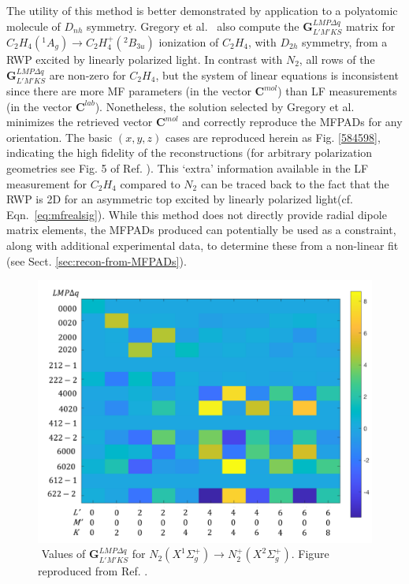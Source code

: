 \documentclass[10pt]{article}
\begin{document}
The utility of this method is better demonstrated by application to a polyatomic molecule of $D_{nh}$ symmetry. Gregory et al.~\cite{gregory2021MolecularFramePhotoelectron} also compute the $\mathbf{{G}}^{LMP\Delta q }_{L'M'KS}$ matrix for $C_2H_4(^1A_g) \rightarrow C_2H_4^+(^2B_{3u})$ ionization of $C_2H_4$, with $D_{2h}$ symmetry, from a RWP excited by linearly polarized light. In contrast with $N_2$, all rows of the $\mathbf{{G}}^{LMP\Delta q }_{L'M'KS}$ are non-zero for $C_2H_4$, but the system of linear equations is inconsistent since there are more MF parameters (in the vector $\mathbf{C}^{mol}$) than LF measurements (in the vector $\mathbf{C}^{lab}$). Nonetheless, the solution selected by Gregory et al. minimizes the retrieved vector $\mathbf{C}^{mol}$ and correctly reproduce the MFPADs for any orientation. The basic $(x,y,z)$ cases are reproduced herein as Fig. \ref{584598}, indicating the high fidelity of the reconstructions (for arbitrary polarization geometries see Fig. 5 of Ref. \cite{gregory2021MolecularFramePhotoelectron}). This `extra' information available in the LF measurement for $C_2H_4$ compared to $N_2$ can be traced back to the fact that the RWP is 2D for an asymmetric top excited by linearly polarized light(cf. Eqn.~\ref{eq:mfrealsig}). While this method does not directly provide radial dipole matrix elements, the MFPADs produced can potentially be used as a constraint, along with additional experimental data, to determine these from a non-linear fit (see Sect. \ref{sec:recon-from-MFPADs}). 

\begin{figure}[]
\begin{center}
\includegraphics[width=\textwidth,height=\dimexpr\textheight-4\baselineskip-\abovecaptionskip-\belowcaptionskip\relax,keepaspectratio]{figures/GFinalplot.png}
\caption{\(\) Values of \(\mathbf{G}^{LMP\Delta q }_{L'M'KS}\) for \(N_2(X^{1}\Sigma^{+}_{g}) \rightarrow N^+_2(X^{2}\Sigma^{+}_{g})\). Figure reproduced from Ref. \cite{gregory2021MolecularFramePhotoelectron}.\label{931809}}
\end{center}
\end{figure}
\end{document}
